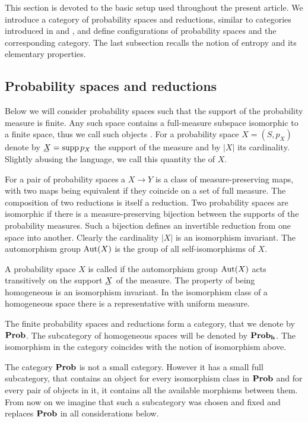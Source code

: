   This section is devoted to the basic setup used throughout the
  present article.  We introduce a category of probability spaces and
  reductions, similar to categories introduced in \cite{Baez-Characterization-2011} and
  \cite{Gromov-Search-2012}, and define configurations of probability
  spaces and the corresponding category.  The last subsection recalls
  the notion of entropy and its elementary properties.

\subsection{Probability spaces and reductions}\label{s:category-prob}
  Below we will consider probability spaces such that the support of
  the probability measure is finite. Any such space contains a
  full-measure subspace isomorphic to a finite space, thus we call
  such objects .  For a probability space $X=(S,p_{X})$ denote by $\un
  X=\supp p_{X}$ the support of the measure and by $|X|$ its
  cardinality. Slightly abusing the language, we call this quantity
  the  of $X$.

  For a pair of probability spaces a  $X\to Y$ is a
  class of measure-preserving maps, with two maps being equivalent if
  they coincide on a set of full measure. The composition of two
  reductions is itself a reduction.  Two probability spaces are
  isomorphic if there is a measure-preserving bijection between
  the supports of the probability measures. Such a bijection defines an
  invertible reduction from one space into another. Clearly the
  cardinality $|X|$ is an isomorphism invariant.
  The automorphism group $\operatorname{\mathrm{Aut}}(X)$ is the group of all
  self-isomorphisms of $X$.

  A probability space $X$ is called  if the automorphism group $\operatorname{\mathrm{Aut}}(X)$ acts
  transitively on the support $\un X$ of the measure.  The property of
  being homogeneous is an isomorphism invariant.  In the isomorphism
  class of a homogeneous space there is a representative with uniform
  measure.

  The finite probability spaces and reductions form a category, that
  we denote by $\operatorname{\mathbf{Prob}}$. The subcategory of homogeneous spaces will be
  denoted by $\operatorname{\mathbf{Prob}}_{\mathbf{h}}$.  The isomorphism in the category coincides
  with the notion of isomorphism above.

  The category $\operatorname{\mathbf{Prob}}$ is not a small category. However it has a small
  full subcategory, that contains an object for every isomorphism class in
  $\operatorname{\mathbf{Prob}}$ and for every pair of objects in it, it contains all the
  available morphisms between them. From now on we imagine that such a
  subcategory was chosen and fixed and replaces $\operatorname{\mathbf{Prob}}$ in all
  considerations below.

